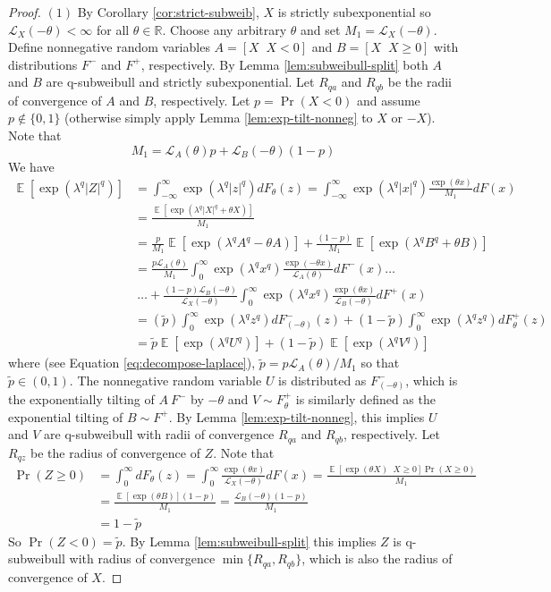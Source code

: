 \documentclass{article}
\theoremstyle{definition}
\DeclareMathOperator{\E}{\mathbb{E}}
\DeclareMathOperator{\given}{\left.\right|}
\begin{document}
\begin{proof}
$(1)$ By Corollary \ref{cor:strict-subweib}, $X$ is strictly subexponential so $\mathcal{L}_X(-\theta)<\infty$ for all $\theta\in\mathbb{R}$. Choose any arbitrary $\theta$ and set $M_1=\mathcal{L}_X(-\theta)$. Define nonnegative random variables $A=[X\given X<0]$ and $B=[X\given X\geq 0]$ with distributions $F^-$ and $F^+$, respectively. By Lemma \ref{lem:subweibull-split} both $A$ and $B$ are q-subweibull and strictly subexponential. Let $R_{qa}$ and $R_{qb}$ be the radii of convergence of $A$ and $B$, respectively. Let $p=\Pr(X<0)$ and assume $p\notin \{0,1\}$ (otherwise simply apply Lemma \ref{lem:exp-tilt-nonneg} to $X$ or $-X$). Note that 
\begin{equation}
\label{eq:decompose-laplace}
M_1 = \mathcal{L}_A(\theta)p + \mathcal{L}_B(-\theta)(1-p)
\end{equation}
We have
\begin{align*}
\E[\exp(\lambda^q\vert Z\vert^q)] &= \int_{-\infty}^\infty \exp(\lambda^q \vert z\vert^q)dF_\theta(z) = \int_{-\infty}^\infty \exp(\lambda^q\vert x\vert^q)\frac{\exp(\theta x)}{M_1}dF(x)\\
&= \frac{\E[\exp(\lambda^q\vert X\vert^q + \theta X)]}{M_1}\\
&= \frac{p}{M_1}\E[\exp(\lambda^q A^q - \theta A)] + \frac{(1-p)}{M_1}\E[\exp(\lambda^q B^q + \theta B)]\\
&= \frac{p \mathcal{L}_{A}(\theta)}{M_1}\int_0^\infty \exp(\lambda^q x^q)\frac{\exp(-\theta x)}{\mathcal{L}_{A}(\theta)}dF^-(x) \ldots\\
&~\ldots+ \frac{(1-p)\mathcal{L}_{B}(-\theta)}{\mathcal{L}_X(-\theta)}\int_0^\infty \exp(\lambda^q x^q)\frac{\exp(\theta x)}{\mathcal{L}_{B}(-\theta)}dF^+(x)\\
&= (\tilde{p}) \int_0^\infty \exp(\lambda^q z^q)dF_{(-\theta)}^-(z) + (1-\tilde{p}) \int_0^\infty \exp(\lambda^q z^q)dF_{\theta}^+(z)\\
&= \tilde{p} \E[\exp(\lambda^q U^q)]+(1-\tilde{p})\E[\exp(\lambda^q V^q)]
\end{align*}
where (see Equation \ref{eq:decompose-laplace}), $\tilde{p}=p\mathcal{L}_A(\theta)/M_1$ so that $\tilde{p}\in (0,1)$. The nonnegative random variable $U$ is distributed as $F_{(-\theta)}^-$, which is the exponentially tilting of $A~F^-$ by $-\theta$ and $V\sim F_\theta^+$ is similarly defined as the exponential tilting of $B\sim F^+$. By Lemma \ref{lem:exp-tilt-nonneg}, this implies $U$ and $V$ are q-subweibull with radii of convergence $R_{qa}$ and $R_{qb}$, respectively. Let $R_{qz}$ be the radius of convergence of $Z$. Note that 
\begin{align*}
\Pr(Z\geq 0) &= \int_0^\infty dF_\theta(z) = \int_0^\infty \frac{\exp(\theta x)}{\mathcal{L}_X(-\theta)}dF(x) = \frac{\E[\exp(\theta X)\given X\geq 0]\Pr(X\geq 0)}{M_1}\\
&= \frac{\E[\exp(\theta B)](1-p)}{M_1} = \frac{\mathcal{L}_B(-\theta) (1-p)}{M_1}\\
&= 1-\tilde{p}
\end{align*}
So $\Pr(Z<0)=\tilde{p}$. By Lemma \ref{lem:subweibull-split} this implies $Z$ is q-subweibull with radius of convergence $\min\{R_{qa},R_{qb}\}$, which is also the radius of convergence of $X$. 


\end{proof}
\end{document}
